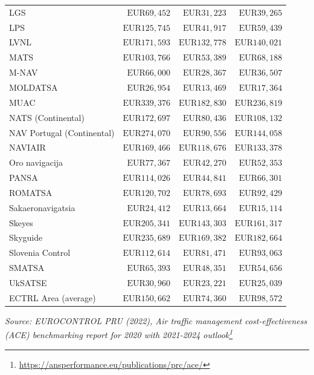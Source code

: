 \documentclass[
  11pt,
  a4paper,
]{book}
\DeclareRobustCommand{\href}[2]{#2\footnote{\url{#1}}}
\begin{document}
\begin{longtable}{lrrr}
LGS & $\text{EUR}69,452$ & $\text{EUR}31,223$ & $\text{EUR}39,265$ \\ 
LPS & $\text{EUR}125,745$ & $\text{EUR}41,917$ & $\text{EUR}59,439$ \\ 
LVNL & $\text{EUR}171,593$ & $\text{EUR}132,778$ & $\text{EUR}140,021$ \\ 
MATS & $\text{EUR}103,766$ & $\text{EUR}53,389$ & $\text{EUR}68,188$ \\ 
M-NAV & $\text{EUR}66,000$ & $\text{EUR}28,367$ & $\text{EUR}36,507$ \\ 
MOLDATSA & $\text{EUR}26,954$ & $\text{EUR}13,469$ & $\text{EUR}17,364$ \\ 
MUAC & $\text{EUR}339,376$ & $\text{EUR}182,830$ & $\text{EUR}236,819$ \\ 
NATS (Continental) & $\text{EUR}172,697$ & $\text{EUR}80,436$ & $\text{EUR}108,132$ \\ 
NAV Portugal (Continental) & $\text{EUR}274,070$ & $\text{EUR}90,556$ & $\text{EUR}144,058$ \\ 
NAVIAIR & $\text{EUR}169,466$ & $\text{EUR}118,676$ & $\text{EUR}133,378$ \\ 
Oro navigacija & $\text{EUR}77,367$ & $\text{EUR}42,270$ & $\text{EUR}52,353$ \\ 
PANSA & $\text{EUR}114,026$ & $\text{EUR}44,841$ & $\text{EUR}66,301$ \\ 
ROMATSA & $\text{EUR}120,702$ & $\text{EUR}78,693$ & $\text{EUR}92,429$ \\ 
Sakaeronavigatsia & $\text{EUR}24,412$ & $\text{EUR}13,664$ & $\text{EUR}15,114$ \\ 
Skeyes & $\text{EUR}205,341$ & $\text{EUR}143,303$ & $\text{EUR}161,317$ \\ 
Skyguide & $\text{EUR}235,689$ & $\text{EUR}169,382$ & $\text{EUR}182,664$ \\ 
Slovenia Control & $\text{EUR}112,614$ & $\text{EUR}81,471$ & $\text{EUR}93,063$ \\ 
SMATSA & $\text{EUR}65,393$ & $\text{EUR}48,351$ & $\text{EUR}54,656$ \\ 
UkSATSE & $\text{EUR}30,960$ & $\text{EUR}23,221$ & $\text{EUR}25,039$ \\ 
ECTRL Area (average) & $\text{EUR}150,662$ & $\text{EUR}74,360$ & $\text{EUR}98,572$ \\ 
\bottomrule
\end{longtable}
\begin{minipage}{\linewidth}
\emph{Source: \href{https://ansperformance.eu/publications/prc/ace/}{EUROCONTROL PRU (2022), Air traffic management cost-effectiveness (ACE) benchmarking report for 2020 with 2021-2024 outlook}}\\
\end{minipage}
\end{document}
